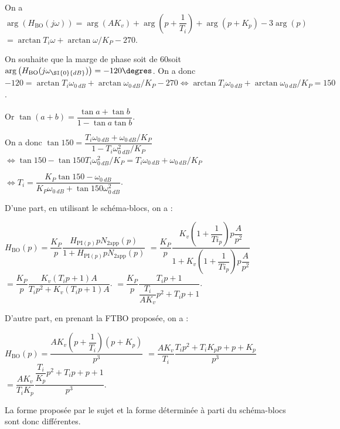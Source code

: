 \ifprof
\begin{corrige}
On a $\arg \left(H_{\text{BO}}(j\omega)\right)=\arg\left(AK_v \right) + \arg\left(p+\dfrac{1}{T_i}\right) + \arg\left(p+K_p\right)-3 \arg(p)$
$ =\arctan T_i\omega +\arctan\omega/K_P -270$.

On souhaite que la marge de phase soit de 60\degres soit 
$\arg \left(H_{\text{BO}}(j\omega_{\SI{0}{dB}})\right)=-120\degres$. 
On a donc 
$-120=\arctan T_i\omega_{\SI{0}{dB}} +\arctan\omega_{\SI{0}{dB}}/K_P -270 \Leftrightarrow \arctan T_i\omega_{\SI{0}{dB}} +\arctan\omega_{\SI{0}{dB}}/K_P = 150$.

Or $\tan(a+b)=\dfrac{\tan a + \tan b}{1-\tan a\tan b}$. 

On a donc $\tan 150 = \dfrac{T_i\omega_{\SI{0}{dB}} + \omega_{\SI{0}{dB}}/K_P}{1-T_i\omega_{\SI{0}{dB}}^2/K_P}$
$ \Leftrightarrow \tan 150 -\tan 150 T_i\omega_{\SI{0}{dB}}^2/K_P= T_i\omega_{\SI{0}{dB}} + \omega_{\SI{0}{dB}}/K_P $

$ \Leftrightarrow  T_i  = \dfrac{K_P\tan 150 - \omega_{\SI{0}{dB}}}{K_P\omega_{\SI{0}{dB}}+\tan 150 \omega_{\SI{0}{dB}}^2}$.


\begin{rem} D'une part, en utilisant le schéma-blocs, on a :

$H_{\text{BO}}(p)=\dfrac{K_P}{p}\dfrac{H_{\text{PI}(p)}pN_{\text{2app}}(p)}{1+H_{\text{PI}(p)}pN_{\text{2app}}(p)}$
$=\dfrac{K_P}{p}\dfrac{K_v\left(1+\dfrac{1}{Ti_ p} \right)p\dfrac{A}{p^2}}{1+K_v\left(1+\dfrac{1}{Ti_ p} \right)p\dfrac{A}{p^2}}$
$=\dfrac{K_P}{p}\dfrac{K_v\left(T_i p+1 \right){A}}{T_i p^2+K_v\left(T_i p+1 \right){A}}$.
$=\dfrac{K_P}{p}\dfrac{T_i p+1}{\dfrac{T_i}{AK_v} p^2+ T_i p+1 }$.

D'autre part, en prenant la FTBO proposée, on a : 

$H_{\text{BO}}(p)=\dfrac{AK_v\left(p+\dfrac{1}{T_i} \right)\left(p+K_p\right)}{p^3}$
$=\dfrac{AK_v}{T_i}\dfrac{T_ip^2+T_iK_pp+p+K_p }{p^3}$
$=\dfrac{AK_v}{T_iK_p}\dfrac{\dfrac{T_i}{K_p}p^2+T_ip+p+1 }{p^3}$.

La forme proposée par le sujet et la forme déterminée à parti du schéma-blocs sont donc différentes. 

\end{rem}
\end{corrige}
\else
\fi

